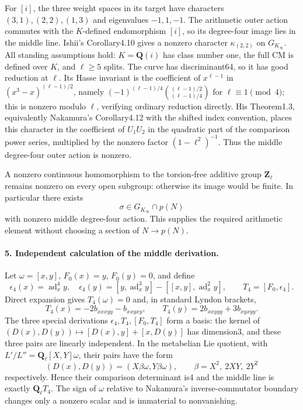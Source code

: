 For $[i]$, the three weight spaces in its target have characters $(3,1),(2,2),(1,3)$ and eigenvalues $-1,1,-1$. The arithmetic outer action commutes with the $K$-defined endomorphism $[i]$, so its degree-four image lies in the middle line. Ishii's Corollary4.10 gives a nonzero character $\kappa_{(2,2)}$ on $G_{K_\infty}$. All standing assumptions hold: $K=\mathbf Q(i)$ has class number one, the full CM is defined over $K$, and $\ell\ge5$ splits. The curve has discriminant64, so it has good reduction at $\ell$. Its Hasse invariant is the coefficient of $x^{\ell-1}$ in $(x^3-x)^{(\ell-1)/2}$, namely $(-1)^{(\ell-1)/4}\binom{(\ell-1)/2}{(\ell-1)/4}$ for $\ell\equiv1\pmod4$; this is nonzero modulo $\ell$, verifying ordinary reduction directly. His Theorem1.3, equivalently Nakamura's Corollary4.12 with the shifted index convention, places this character in the coefficient of $U_1U_2$ in the quadratic part of the comparison power series, multiplied by the nonzero factor $(1-\ell^2)^{-1}$. Thus the middle degree-four outer action is nonzero.

A nonzero continuous homomorphism to the torsion-free additive group $\mathbf Z_\ell$ remains nonzero on every open subgroup: otherwise its image would be finite. In particular there exists
\[
 \sigma\in G_{K_\infty}\cap p(N)
\]
with nonzero middle degree-four action. This supplies the required arithmetic element without choosing a section of $N\to p(N)$.

\paragraph{5. Independent calculation of the middle derivation.}
Let $\omega=[x,y]$, $F_0(x)=y$, $F_0(y)=0$, and define
\[
 \epsilon_4(x)=\operatorname{ad}_x^4y,\quad
 \epsilon_4(y)=[y,\operatorname{ad}_x^3y]-[[x,y],\operatorname{ad}_x^2y],
 \qquad T_4=[F_0,\epsilon_4].
\]
Direct expansion gives $T_4(\omega)=0$ and, in standard Lyndon brackets,
\[
 T_4(x)=-2b_{xxxyy}-b_{xxyxy},\qquad
 T_4(y)=2b_{xxyyy}+3b_{xyxyy}.
\]
The three special derivations $\epsilon_4,T_4,[F_0,T_4]$ form a basis: the kernel of $(D(x),D(y))\mapsto[D(x),y]+[x,D(y)]$ has dimension3, and these three pairs are linearly independent. In the metabelian Lie quotient, with $L'/L''=\mathbf Q_\ell[X,Y]\omega$, their pairs have the form
\[
 (D(x),D(y))=(X\beta\omega,Y\beta\omega),\qquad
 \beta=X^2,\ 2XY,\ 2Y^2
\]
respectively. Hence their comparison determinant is4 and the middle line is exactly $\mathbf Q_\ell T_4$. The sign of $\omega$ relative to Nakamura's inverse-commutator boundary changes only a nonzero scalar and is immaterial to nonvanishing.

